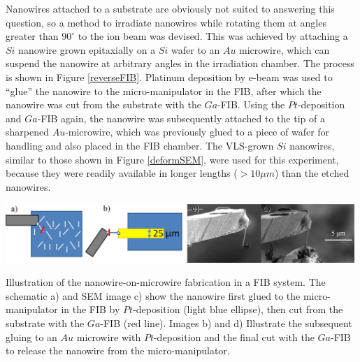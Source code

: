 \begin{Figure}[h]
Nanowires attached to a substrate are obviously not suited to answering this question, so a method to irradiate nanowires while rotating them at angles greater than $90^\circ$ to the ion beam was devised. This was achieved by attaching a $Si$ nanowire grown epitaxially on a $Si$ wafer to an $Au$ microwire, which can suspend the nanowire at arbitrary angles in the irradiation chamber. The process is shown in Figure \ref{reverseFIB}. Platinum deposition by e-beam was used to ``glue'' the nanowire to the micro-manipulator in the FIB, after which the nanowire was cut from the substrate with the $Ga$-FIB. Using the $Pt$-deposition and $Ga$-FIB again, the nanowire was subsequently attached to the tip of a sharpened $Au$-microwire, which was previously glued to a piece of wafer for handling and also placed in the FIB chamber. The VLS-grown $Si$ nanowires, similar to those shown in Figure \ref{deformSEM}, were used for this experiment, because they were readily available in longer lengths ($>10\mu m$) than the etched nanowires.

\begin{Figure}[thbp]
	\centering
		\includegraphics[width=0.99\textwidth]{images/reverseFIB.jpg}
	\caption{Illustration of the nanowire-on-microwire fabrication in a FIB system. The schematic a) and SEM image c) show the nanowire first glued to the micro-manipulator in the FIB by $Pt$-deposition (light blue ellipse), then cut from the substrate with the $Ga$-FIB (red line). Images b) and d) Illustrate the subsequent gluing to an $Au$ microwire with $Pt$-deposition and the final cut with the $Ga$-FIB to release the nanowire from the micro-manipulator.}
	\label{reverseFIB}
\end{Figure}


\end{Figure}
